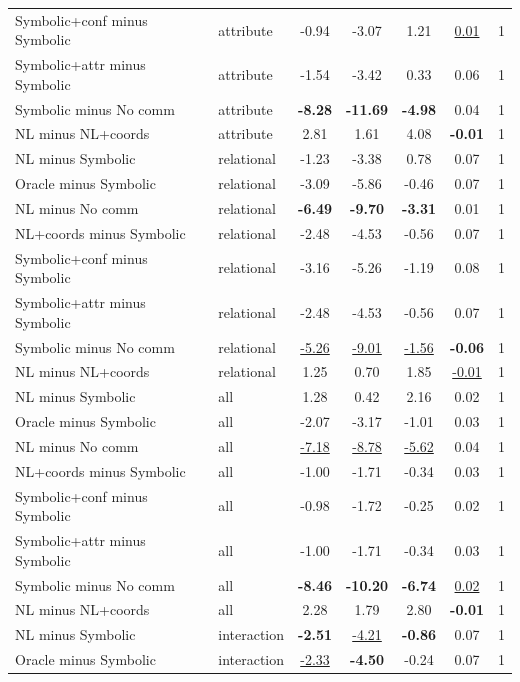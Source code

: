 \begin{tabular}{llccccc}
Symbolic+conf minus Symbolic & attribute & -0.94 & -3.07 & 1.21 & \underline{0.01} & 1 \\
Symbolic+attr minus Symbolic & attribute & -1.54 & -3.42 & 0.33 & 0.06 & 1 \\
Symbolic minus No comm & attribute & \textbf{-8.28} & \textbf{-11.69} & \textbf{-4.98} & 0.04 & 1 \\
NL minus NL+coords & attribute & 2.81 & 1.61 & 4.08 & \textbf{-0.01} & 1 \\
\midrule
NL minus Symbolic & relational & -1.23 & -3.38 & 0.78 & 0.07 & 1 \\
Oracle minus Symbolic & relational & -3.09 & -5.86 & -0.46 & 0.07 & 1 \\
NL minus No comm & relational & \textbf{-6.49} & \textbf{-9.70} & \textbf{-3.31} & 0.01 & 1 \\
NL+coords minus Symbolic & relational & -2.48 & -4.53 & -0.56 & 0.07 & 1 \\
Symbolic+conf minus Symbolic & relational & -3.16 & -5.26 & -1.19 & 0.08 & 1 \\
Symbolic+attr minus Symbolic & relational & -2.48 & -4.53 & -0.56 & 0.07 & 1 \\
Symbolic minus No comm & relational & \underline{-5.26} & \underline{-9.01} & \underline{-1.56} & \textbf{-0.06} & 1 \\
NL minus NL+coords & relational & 1.25 & 0.70 & 1.85 & \underline{-0.01} & 1 \\
\midrule
NL minus Symbolic & all & 1.28 & 0.42 & 2.16 & 0.02 & 1 \\
Oracle minus Symbolic & all & -2.07 & -3.17 & -1.01 & 0.03 & 1 \\
NL minus No comm & all & \underline{-7.18} & \underline{-8.78} & \underline{-5.62} & 0.04 & 1 \\
NL+coords minus Symbolic & all & -1.00 & -1.71 & -0.34 & 0.03 & 1 \\
Symbolic+conf minus Symbolic & all & -0.98 & -1.72 & -0.25 & 0.02 & 1 \\
Symbolic+attr minus Symbolic & all & -1.00 & -1.71 & -0.34 & 0.03 & 1 \\
Symbolic minus No comm & all & \textbf{-8.46} & \textbf{-10.20} & \textbf{-6.74} & \underline{0.02} & 1 \\
NL minus NL+coords & all & 2.28 & 1.79 & 2.80 & \textbf{-0.01} & 1 \\
\midrule
NL minus Symbolic & interaction & \textbf{-2.51} & \underline{-4.21} & \textbf{-0.86} & 0.07 & 1 \\
Oracle minus Symbolic & interaction & \underline{-2.33} & \textbf{-4.50} & -0.24 & 0.07 & 1 \\

\end{tabular}
